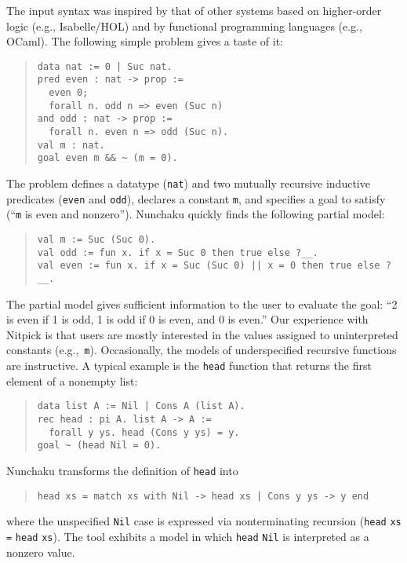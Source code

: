 The input syntax was inspired by that of other systems based on higher-order
logic (e.g., Isabelle/HOL) and by functional programming languages (e.g.,
OCaml). The following simple problem gives a taste of it:
%
\begin{quote}
\verb$data nat := 0 | Suc nat.$ \\[2\jot]
\verb$pred even : nat -> prop :=$ \\
\verb$  even 0;$ \\
\verb$  forall n. odd n => even (Suc n)$ \\
\verb$and odd : nat -> prop :=$ \\
\verb$  forall n. even n => odd (Suc n).$ \\[2\jot]
\verb$val m : nat.$ \\
\verb$goal even m && ~ (m = 0).$
\end{quote}
%
The problem defines a datatype (\texttt{nat}) and two mutually recursive
inductive predicates (\texttt{even} and \texttt{odd}), declares a constant
\texttt{m}, and specifies a goal to satisfy (``\texttt{m} is even and nonzero'').
Nunchaku quickly finds the following partial model:
%
\begin{quote}
\verb$val m := Suc (Suc 0).$ \\
\verb$val odd := fun x. if x = Suc 0 then true else ?__.$ \\
\verb$val even := fun x. if x = Suc (Suc 0) || x = 0 then true else ?__.$\kern-200mm
\end{quote}
%
The partial model gives sufficient information to the user to evaluate the
goal: ``2 is even if 1 is odd, 1 is odd if 0 is even, and 0 is even.''
Our experience with Nitpick
is that users are mostly interested in the values assigned to uninterpreted
constants (e.g.,~\texttt{m}). Occasionally, the models of underspecified
recursive functions are instructive. A typical example is
the \texttt{head} function that returns the first element of a nonempty list:
%
\begin{quote}
\verb$data list A := Nil | Cons A (list A).$ \\[2\jot]
\verb$rec head : pi A. list A -> A :=$ \\
\verb$  forall y ys. head (Cons y ys) = y.$ \\[2\jot]
\verb$goal ~ (head Nil = 0).$
\end{quote}
%
Nunchaku transforms the definition of \verb$head$ into
%
\begin{quote}
\verb$head xs = match xs with Nil -> head xs | Cons y ys -> y end$
\end{quote}
%
where the unspecified \verb$Nil$ case is expressed via nonterminating
recursion (\verb$head$ \verb$xs$ \verb$=$ \verb$head$ \verb$xs$).
The tool exhibits a model in which \verb$head$ \verb$Nil$ is interpreted as
a nonzero value.

